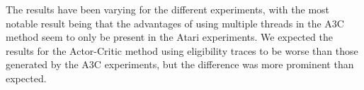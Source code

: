 \documentclass[11pt]{article}
\begin{document}
The results have been varying for the different experiments, with
the most notable result being that the advantages of using multiple threads in the A3C method
seem to only be present in the Atari experiments.
We expected the results for the Actor-Critic method using eligibility traces
to be worse than those generated by the A3C experiments, 
but the difference was more prominent than expected.
\end{document}
